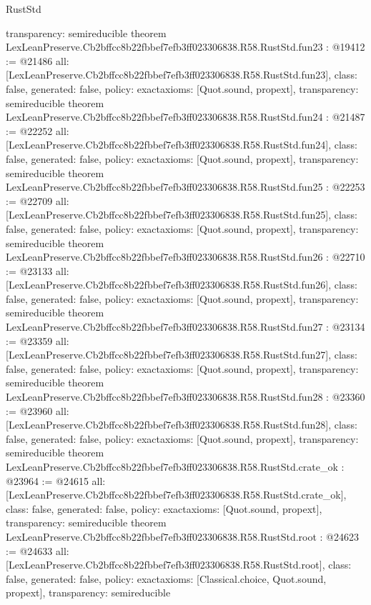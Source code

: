 \begin{lexlean}{RustStd}
\begin{coremodule}
{  transparency: semireducible
}
theorem LexLeanPreserve.Cb2bffcc8b22fbbef7efb3ff023306838.R58.RustStd.fun23 : @19412 := @21486 {
  all: [LexLeanPreserve.Cb2bffcc8b22fbbef7efb3ff023306838.R58.RustStd.fun23],
  class: false,
  generated: false,
  policy: exact{axioms: [Quot.sound, propext]},
  transparency: semireducible
}
theorem LexLeanPreserve.Cb2bffcc8b22fbbef7efb3ff023306838.R58.RustStd.fun24 : @21487 := @22252 {
  all: [LexLeanPreserve.Cb2bffcc8b22fbbef7efb3ff023306838.R58.RustStd.fun24],
  class: false,
  generated: false,
  policy: exact{axioms: [Quot.sound, propext]},
  transparency: semireducible
}
theorem LexLeanPreserve.Cb2bffcc8b22fbbef7efb3ff023306838.R58.RustStd.fun25 : @22253 := @22709 {
  all: [LexLeanPreserve.Cb2bffcc8b22fbbef7efb3ff023306838.R58.RustStd.fun25],
  class: false,
  generated: false,
  policy: exact{axioms: [Quot.sound, propext]},
  transparency: semireducible
}
theorem LexLeanPreserve.Cb2bffcc8b22fbbef7efb3ff023306838.R58.RustStd.fun26 : @22710 := @23133 {
  all: [LexLeanPreserve.Cb2bffcc8b22fbbef7efb3ff023306838.R58.RustStd.fun26],
  class: false,
  generated: false,
  policy: exact{axioms: [Quot.sound, propext]},
  transparency: semireducible
}
theorem LexLeanPreserve.Cb2bffcc8b22fbbef7efb3ff023306838.R58.RustStd.fun27 : @23134 := @23359 {
  all: [LexLeanPreserve.Cb2bffcc8b22fbbef7efb3ff023306838.R58.RustStd.fun27],
  class: false,
  generated: false,
  policy: exact{axioms: [Quot.sound, propext]},
  transparency: semireducible
}
theorem LexLeanPreserve.Cb2bffcc8b22fbbef7efb3ff023306838.R58.RustStd.fun28 : @23360 := @23960 {
  all: [LexLeanPreserve.Cb2bffcc8b22fbbef7efb3ff023306838.R58.RustStd.fun28],
  class: false,
  generated: false,
  policy: exact{axioms: [Quot.sound, propext]},
  transparency: semireducible
}
theorem LexLeanPreserve.Cb2bffcc8b22fbbef7efb3ff023306838.R58.RustStd.crate_ok : @23964 := @24615 {
  all: [LexLeanPreserve.Cb2bffcc8b22fbbef7efb3ff023306838.R58.RustStd.crate_ok],
  class: false,
  generated: false,
  policy: exact{axioms: [Quot.sound, propext]},
  transparency: semireducible
}
theorem LexLeanPreserve.Cb2bffcc8b22fbbef7efb3ff023306838.R58.RustStd.root : @24623 := @24633 {
  all: [LexLeanPreserve.Cb2bffcc8b22fbbef7efb3ff023306838.R58.RustStd.root],
  class: false,
  generated: false,
  policy: exact{axioms: [Classical.choice, Quot.sound, propext]},
  transparency: semireducible
}


\end{coremodule}
\end{lexlean}
